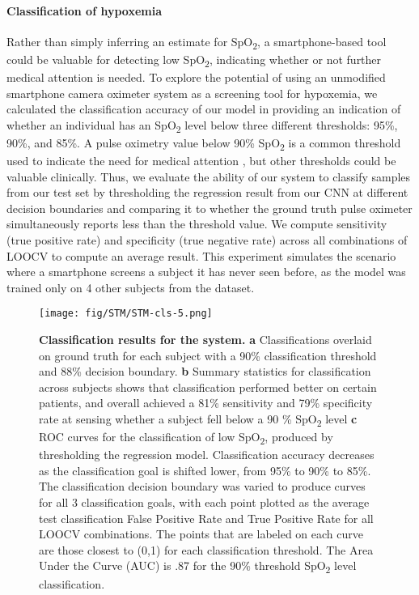 \documentclass[12pt]{article}
\begin{document}
\paragraph*{Classification of hypoxemia}
Rather than simply inferring an estimate for SpO\textsubscript{2}, a smartphone-based tool could be valuable for detecting low SpO\textsubscript{2}, indicating whether or not further medical attention is needed.  To explore the potential of using an unmodified smartphone camera oximeter system as a screening tool for hypoxemia, we calculated the classification accuracy of our model in providing an indication of whether an individual has an SpO\textsubscript{2} level below three different thresholds: 95\%, 90\%, and 85\%. A pulse oximetry value below 90\% SpO\textsubscript{2} is a common threshold used to indicate the need for medical attention \cite{jones2003feasibility}, but other thresholds could be valuable clinically.
Thus, we evaluate the ability of our system to classify samples from our test set by thresholding the regression result from our CNN at different decision boundaries and comparing it to whether the ground truth pulse oximeter simultaneously reports less than the threshold value. We compute sensitivity (true positive rate) and specificity (true negative rate) across all combinations of LOOCV to compute an average result. This experiment simulates the scenario where a smartphone screens a subject it has never seen before, as the model  was trained only on 4 other subjects from the dataset.

\begin{figure}
\texttt{[image: fig/STM/STM-cls-5.png]}
\caption{\textbf{Classification results for the system.}
\textbf{a} Classifications 
overlaid on ground truth for each subject with a 90\% classification threshold and 88\% decision boundary. 
\textbf{b} Summary statistics for classification across subjects shows that classification performed better on certain patients, and overall achieved a 81\% sensitivity and 79\% specificity rate at sensing whether a subject fell below a 90 \% SpO\textsubscript{2} level
\textbf{c} ROC curves for the classification of low SpO\textsubscript{2}, produced by thresholding the regression model. Classification accuracy decreases as the classification goal is shifted lower, from 95\% to 90\% to 85\%. The classification decision boundary was varied to produce curves for all 3 classification goals, with each point plotted as the average test classification False Positive Rate and True Positive Rate for all LOOCV combinations. The points that are labeled on each curve are those closest to (0,1) for each classification threshold.  The Area Under the Curve (AUC) is .87 for the 90\% threshold SpO\textsubscript{2} level classification.
}
\label{cls}
\end{figure}
\end{document}
